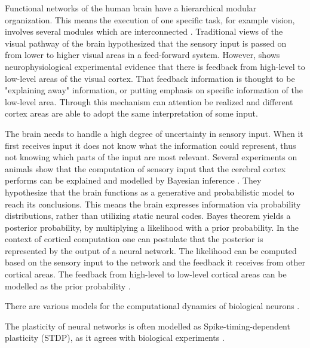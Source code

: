 Functional networks of the human brain have a hierarchical modular organization. This means the execution of one specific task, for example vision, involves several modules which are interconnected  \citep{hierarchicalBrain}. Traditional views of the visual pathway of the brain hypothesized that the sensory input is passed on from lower to higher visual areas in a feed-forward system. However, \citet{HierachicalBayesVisualCortex} shows  neurophysiological experimental evidence that there is feedback from high-level to low-level areas of the visual cortex. That feedback information is thought to be "explaining away" information, or putting emphasis on specific information of the low-level area. Through this mechanism can attention be realized and different cortex areas are able to adopt the same interpretation of some input.
 
The brain needs to handle a high degree of uncertainty in sensory input. When it first receives input it does not know what the information could represent, thus not knowing which parts of the input are most relevant. Several experiments on animals show that the computation of sensory input that the cerebral cortex performs can be explained and modelled by Bayesian inference \citep{neuralSubstrate, HierachicalBayesVisualCortex, anatomyOfInference}. They hypothesize that the brain functions as a generative and probabilistic model to reach its conclusions. This means the brain expresses information via probability distributions, rather than utilizing static neural codes. Bayes theorem yields a posterior probability, by multiplying a likelihood with a prior probability. In the context of cortical computation one can postulate that the posterior is represented by the output of a neural network. The likelihood can be computed based on the sensory input to the network and the feedback it receives from other cortical areas. The feedback from high-level to low-level cortical areas can be modelled as the prior probability \citep{nessler}.

There are various models for the computational dynamics of biological neurons \citep{SpikingNeuronModelsBook}. 


The plasticity of neural networks is often modelled as Spike-timing-dependent plasticity (STDP), as it agrees with biological experiments \citep{STDPFELDMAN, STDPDAN}. 

